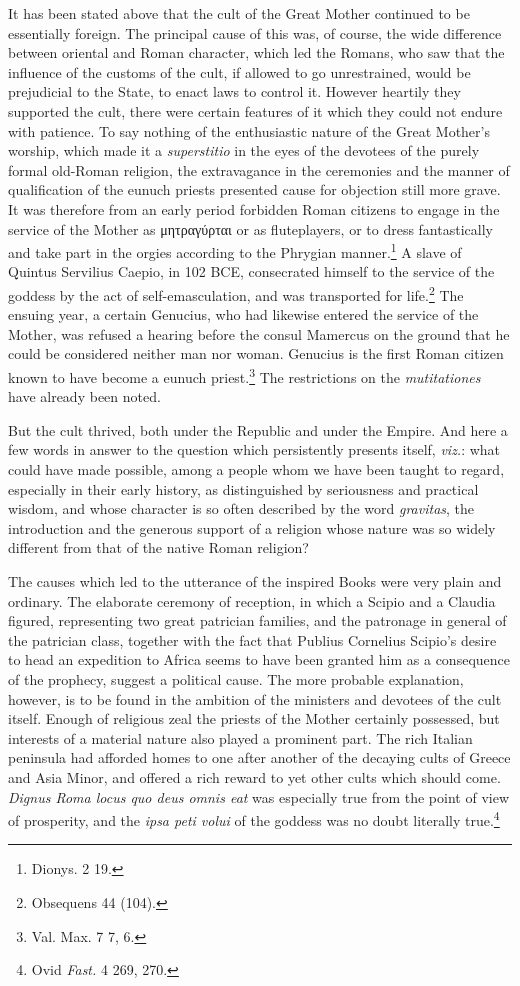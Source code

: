 \documentclass[a4paper, 11pt, oneside, polutonikogreek, english]{article}
\begin{document}
It has been stated above that the cult of the Great Mother continued to be essentially foreign. The principal cause of this was, of course, the wide difference between oriental and Roman character, which led the Romans, who saw that the influence of the customs of the cult, if allowed to go unrestrained, would be prejudicial to the State, to enact laws to control it. However heartily they supported the cult, there were certain features of it which they could not endure with patience. To say nothing of the enthusiastic nature of the Great Mother's worship, which made it a \emph{superstitio} in the eyes of the devotees of the purely formal old-Roman religion, the extravagance in the ceremonies and the manner of qualification of the eunuch priests presented cause for objection still more grave. It was therefore from an early period forbidden Roman citizens to engage in the service of the Mother as μητραγύρται or as fluteplayers, or to dress fantastically and take part in the orgies according to the Phrygian manner.\footnote{Dionys. 2 19.} A slave of Quintus Servilius Caepio, in 102 \textsc{BCE}, consecrated himself to the service of the goddess by the act of self-emasculation, and was transported for life.\footnote{Obsequens 44 (104).} The ensuing year, a certain Genucius, who had likewise entered the service of the Mother, was refused a hearing before the consul Mamercus on the ground that he could be considered neither man nor woman. Genucius is the first Roman citizen known to have become a eunuch priest.\footnote{Val. Max. 7 7, 6.} The restrictions on the \emph{mutitationes} have already been noted.

But the cult thrived, both under the Republic and under the Empire. And here a few words in answer to the question which persistently presents itself, \emph{viz.}: what could have made possible, among a people whom we have been taught to regard, especially in their early history, as distinguished by seriousness and practical wisdom, and whose character is so often described by the word \emph{gravitas}, the introduction and the generous support of a religion whose nature was so widely different from that of the native Roman religion?

The causes which led to the utterance of the inspired Books were very plain and ordinary. The elaborate ceremony of reception, in which a Scipio and a Claudia figured, representing two great patrician families, and the patronage in general of the patrician class, together with the fact that Publius Cornelius Scipio's desire to head an expedition to Africa seems to have been granted him as a consequence of the prophecy, suggest a political cause. The more probable explanation, however, is to be found in the ambition of the ministers and devotees of the cult itself. Enough of religious zeal the priests of the Mother certainly possessed, but interests of a material nature also played a prominent part. The rich Italian peninsula had afforded homes to one after another of the decaying cults of Greece and Asia Minor, and offered a rich reward to yet other cults which should come. \emph{Dignus Roma locus quo deus omnis eat} was especially true from the point of view of prosperity, and the \emph{ipsa peti volui} of the goddess was no doubt literally true.\footnote{Ovid \emph{Fast.} 4 269, 270.}
\end{document}
